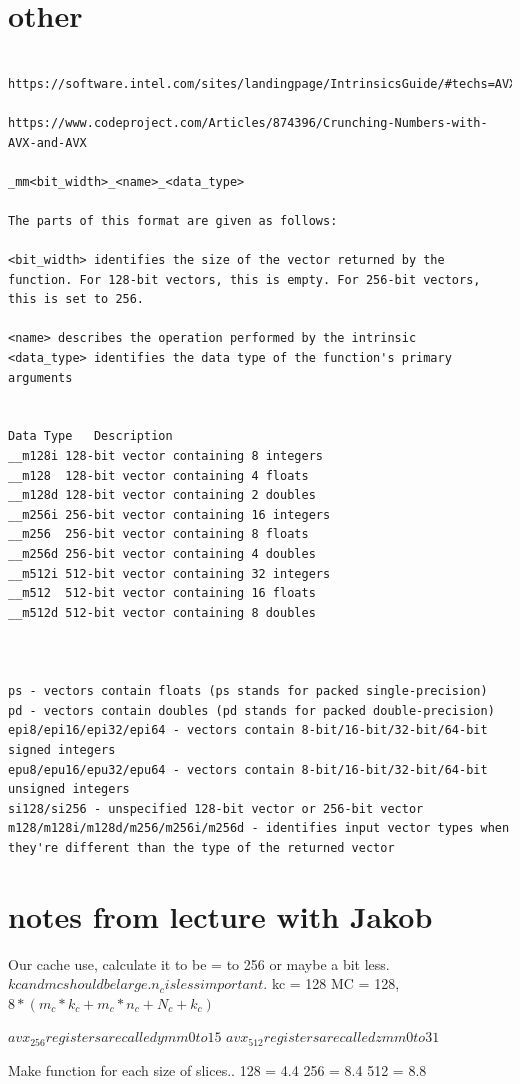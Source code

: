 \documentclass[a4paper,10pt,titlepage]{report}
\begin{document}
\section{other}
\begin{lstlisting}
 https://software.intel.com/sites/landingpage/IntrinsicsGuide/#techs=AVX_512&cats=Elementary%20Math%20Functions,Load 
	
https://www.codeproject.com/Articles/874396/Crunching-Numbers-with-AVX-and-AVX

_mm<bit_width>_<name>_<data_type> 

The parts of this format are given as follows:

<bit_width> identifies the size of the vector returned by the function. For 128-bit vectors, this is empty. For 256-bit vectors, this is set to 256.

<name> describes the operation performed by the intrinsic
<data_type> identifies the data type of the function's primary arguments


Data Type	Description
__m128i	128-bit vector containing 8 integers
__m128	128-bit vector containing 4 floats
__m128d	128-bit vector containing 2 doubles
__m256i	256-bit vector containing 16 integers
__m256	256-bit vector containing 8 floats
__m256d	256-bit vector containing 4 doubles
__m512i	512-bit vector containing 32 integers
__m512	512-bit vector containing 16 floats
__m512d	512-bit vector containing 8 doubles



ps - vectors contain floats (ps stands for packed single-precision)
pd - vectors contain doubles (pd stands for packed double-precision)
epi8/epi16/epi32/epi64 - vectors contain 8-bit/16-bit/32-bit/64-bit signed integers
epu8/epu16/epu32/epu64 - vectors contain 8-bit/16-bit/32-bit/64-bit unsigned integers
si128/si256 - unspecified 128-bit vector or 256-bit vector
m128/m128i/m128d/m256/m256i/m256d - identifies input vector types when they're different than the type of the returned vector

\end{lstlisting}

\section{notes from lecture with Jakob}

Our cache use, calculate it to be = to 256 or maybe a bit less.
$kc and mc should be large. n_c is less important.$
kc = 128 MC = 128, 
$8* (m_c*k_c+m_c*n_c+N_c+k_c)$


$avx_256 registers are called ymm0 to 15$
$avx_512 registers are called zmm0 to 31$


Make function for each size of slices..
128 = 4.4 
256 = 8.4 
512 = 8.8
\end{document}
